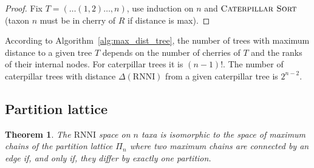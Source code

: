 \documentclass{amsart}
\newcommand{\rnni}{\mathrm{RNNI}}
\newcommand{\csort}{\textsc{Caterpillar Sort}}
\newtheorem{theorem}[definition]{Theorem}
\begin{document}
\begin{proof}
    Fix $T = (\ldots(1,2) \ldots ,n)$, use induction on $n$ and $\csort$ (taxon $n$ must be in cherry of $R$ if distance is max).
\end{proof}

According to Algorithm~\ref{alg:max_dist_tree}, the number of trees with maximum distance to a given tree $T$ depends on the number of cherries of $T$ and the ranks of their internal nodes.
For caterpillar trees it is $(n-1)!$.
The number of caterpillar trees with distance $\Delta(\rnni)$ from a given caterpillar tree is $2^{n-2}$.





\subsection{Partition lattice}


\begin{theorem}
	The $\rnni$ space on $n$ taxa is isomorphic to the space of maximum chains of the partition lattice $\Pi_n$ where two maximum chains are connected by an edge if, and only if, they differ by exactly one partition.
\end{theorem}


\printbibliography
\end{document}
